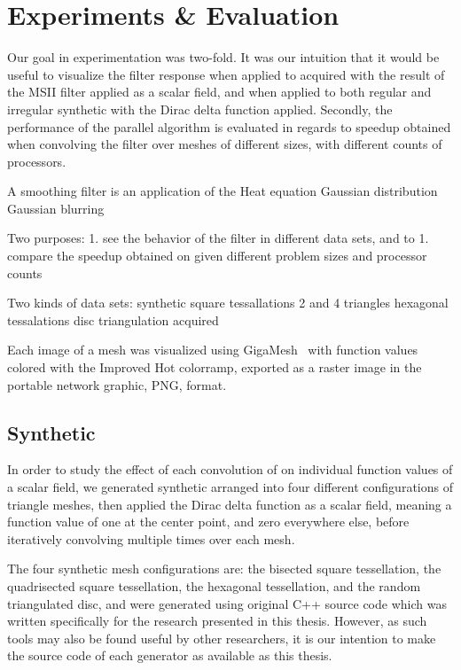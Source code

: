\chapter{Experiments \& Evaluation}
Our goal in experimentation was two-fold. It was our intuition that it would be useful to visualize the filter response when applied to acquired \tdd{} with the result of the MSII filter applied as a scalar field, and when applied to both regular and irregular synthetic \tdd{} with the Dirac delta function applied. Secondly, the performance of the parallel algorithm is evaluated in regards to speedup obtained when convolving the filter over meshes of different sizes, with different counts of processors.

A smoothing filter is an application of the Heat equation 
Gaussian distribution
Gaussian blurring

Two purposes:
	1. see the behavior of the filter in different data sets, and to
	1. compare the speedup obtained on given different problem sizes and processor counts

Two kinds of data sets:
	synthetic
		square tessallations 2 and 4 triangles
		hexagonal tessalations
		disc triangulation
	acquired

Each image of a mesh was visualized using GigaMesh~\cite{Mara10} with function values colored with the Improved Hot colorramp, exported as a raster image in the portable network graphic, PNG, format.




%
%
%
%
%
%
\section{Synthetic \tdd{}}
In order to study the effect of each convolution of  on individual function values of a scalar field, we generated synthetic \tdd{} arranged into four different configurations of triangle meshes, then applied the Dirac delta function as a scalar field, meaning a function value of one at the center point, and zero everywhere else, before iteratively convolving  multiple times over each mesh.

The four synthetic mesh configurations are: the bisected square tessellation, the quadrisected square tessellation, the hexagonal tessellation, and the random triangulated disc, and were generated using original C++ source code which was written specifically for the research presented in this thesis. However, as such tools may also be found useful by other researchers, it is our intention to make the source code of each generator as available as this thesis.

